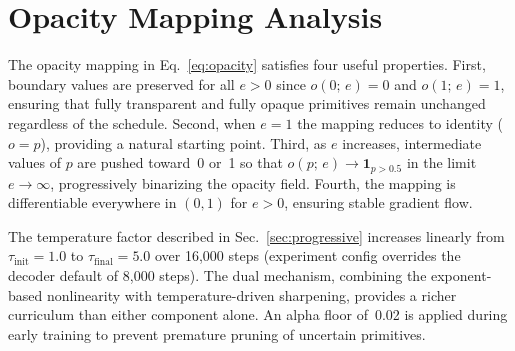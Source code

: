 \begin{table}[!htbp]
\centering
\caption{\textbf{Primitive$\to$Mesh degradation on RE10K (6 views).} We report PSNR under primitive rendering (Prim.) and mesh rendering (Mesh), and their difference $\Delta$. A smaller $|\Delta|$ indicates that the exported mesh faithfully preserves the rendering quality of the native primitives.}
\label{tab:app_prim_to_mesh}
\end{table}

\section{Opacity Mapping Analysis}
\label{sec:app_opacity_derivation}

The opacity mapping in Eq.~\eqref{eq:opacity} satisfies four useful properties. First, boundary values are preserved for all $e > 0$ since $o(0;\,e) = 0$ and $o(1;\,e) = 1$, ensuring that fully transparent and fully opaque primitives remain unchanged regardless of the schedule. Second, when $e = 1$ the mapping reduces to identity ($o = p$), providing a natural starting point. Third, as $e$ increases, intermediate values of $p$ are pushed toward~0 or~1 so that $o(p;\,e) \to \mathbf{1}_{p > 0.5}$ in the limit $e \to \infty$, progressively binarizing the opacity field. Fourth, the mapping is differentiable everywhere in $(0,1)$ for $e > 0$, ensuring stable gradient flow.

The temperature factor described in Sec.~\ref{sec:progressive} increases linearly from $\tau_{\mathrm{init}} = 1.0$ to $\tau_{\mathrm{final}} = 5.0$ over 16{,}000 steps (experiment config overrides the decoder default of 8{,}000 steps). The dual mechanism, combining the exponent-based nonlinearity with temperature-driven sharpening, provides a richer curriculum than either component alone. An alpha floor of~0.02 is applied during early training to prevent premature pruning of uncertain primitives.

